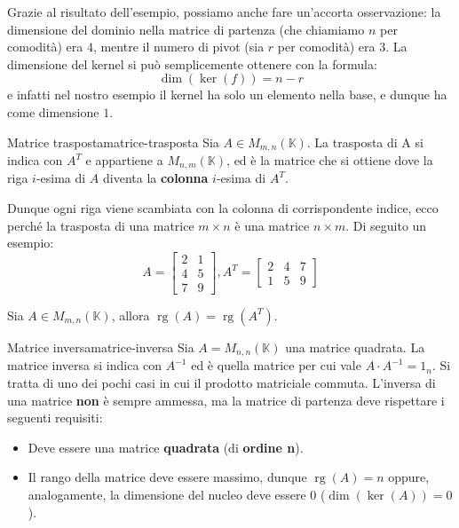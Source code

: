 \documentclass[12pt]{report}
\newcommand{\K}{\mathbb{K}}
\newcommand{\rg}{\operatorname{rg}}
\begin{document}
	Grazie al risultato dell'esempio, possiamo anche fare un'accorta osservazione: la dimensione del dominio nella matrice di partenza (che chiamiamo $n$ per comodità) era $4$, mentre il numero di pivot (sia $r$ per comodità) era $3$. La dimensione del kernel si può semplicemente ottenere con la formula:
	\[
		\dim(\ker(f)) = n - r
	\]
	e infatti nel nostro esempio il kernel ha solo un elemento nella base, e dunque ha come dimensione $1$.
	
	\begin{definizione}{Matrice trasposta}{matrice-trasposta}
		Sia $A \in M_{m,n}(\K)$. La trasposta di A si indica con $A^T$ e appartiene a $M_{n,m}(\K)$, ed è la matrice che si ottiene dove la riga $i$-esima di $A$ diventa la \textbf{colonna} $i$-esima di $A^T$.
	\end{definizione}
	Dunque ogni riga viene scambiata con la colonna di corrispondente indice, ecco perché la trasposta di una matrice $m \times n$ è una matrice $n \times m$.
	Di seguito un esempio:
	\[
		A = 
		\begin{bmatrix}
			2 & 1\\
			4 & 5\\
			7 & 9
		\end{bmatrix}, A^T = 
		\begin{bmatrix}
			2 & 4 & 7\\
			1 & 5 & 9
		\end{bmatrix}
	\]
	
	\begin{proposizione}{}{}
		Sia $A \in M_{m,n}(\K)$, allora $\rg(A) = \rg(A^T)$.
	\end{proposizione}
	
	\begin{definizione}{Matrice inversa}{matrice-inversa}
		Sia $A = M_{n,n}(\K)$ una matrice quadrata. La matrice inversa si indica con $A^{-1}$ ed è quella matrice per cui vale $A \cdot A^{-1} = 1_n$. Si tratta di uno dei pochi casi in cui il prodotto matriciale commuta.
		L'inversa di una matrice \textbf{non} è sempre ammessa, ma la matrice di partenza deve rispettare i seguenti requisiti:
		
		\begin{itemize}
			\item Deve essere una matrice \textbf{quadrata} (di \textbf{ordine n}).
			\item Il rango della matrice deve essere massimo, dunque $\rg(A) = n$ oppure, analogamente, la dimensione del nucleo deve essere $0$ ($\dim(\ker(A)) = 0$).
		\end{itemize}
		
	\end{definizione}
	
\end{document}
